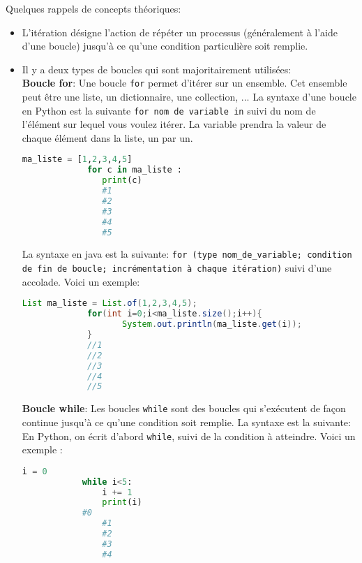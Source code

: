     Quelques rappels de concepts théoriques: \\
    
    \begin{itemize}
    	\item L'itération désigne l'action de répéter un processus (généralement à l'aide d'une boucle) jusqu'à ce qu'une condition particulière soit remplie.
    	\item Il y a deux types de boucles qui sont majoritairement utilisées: \\
    	
    	\textbf{Boucle for}: Une boucle \lstinline{for} permet d'itérer sur un ensemble. Cet ensemble peut être une liste, un dictionnaire, une collection, ... La syntaxe d'une boucle en Python est la suivante \lstinline{for nom de variable in} suivi du nom de l'élément sur lequel vous voulez itérer. La variable prendra la valeur de chaque élément dans la liste, un par un. \\
    	
    	\begin{lstlisting}[language=Python]
             ma_liste = [1,2,3,4,5]
             for c in ma_liste :
             	print(c)
             	#1
             	#2
             	#3
             	#4
             	#5 \end{lstlisting}
             	
     	La syntaxe en java est la suivante: \lstinline{for (type nom_de_variable; condition de fin de boucle; incrémentation à chaque itération)} suivi d'une accolade. Voici un exemple: \\
     	
     	\begin{lstlisting}[language=Java]
             List ma_liste = List.of(1,2,3,4,5);
             for(int i=0;i<ma_liste.size();i++){
            		System.out.println(ma_liste.get(i));
             }
             //1
             //2
             //3
             //4
             //5
        	 \end{lstlisting}
        	 
        \textbf{Boucle while}: Les boucles \lstinline{while} sont des boucles qui s’exécutent de façon continue jusqu’à ce qu’une condition soit remplie. La syntaxe est la suivante: En Python, on écrit d’abord \lstinline{while}, suivi de la condition à atteindre. Voici un exemple : \\
     	
     	\begin{lstlisting}[language=Python]
                i = 0
    		while i<5:
        		i += 1
        		print(i)
        	#0
            	#1
            	#2
            	#3
            	#4 \end{lstlisting}
     	

\end{itemize}

